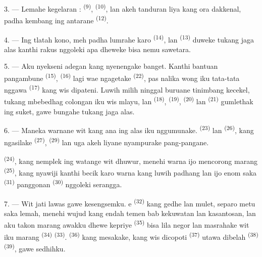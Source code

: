 3. --- Lemahe kegelaran  : 
\textsuperscript{(9)},  \textsuperscript{(10)},
lan akeh tanduran liya kang ora dakkenal, padha kembang ing antarane
 \textsuperscript{(12)}.

4. --- Ing tlatah kono,  meh padha lumrahe karo
 \textsuperscript{(14)}, lan 
\textsuperscript{(13)} duweke tukang jaga alas kanthi rakus nggoleki
apa dheweke bisa nemu sawetara.

\VUsaut{3.0mm}
\VUsaut{3.0mm}

5. --- Aku nyekseni  adegan kang nyenengake banget.
Kanthi bantuan pangambune  \textsuperscript{(15)},
 \textsuperscript{(16)} lagi wae ngagetake
 \textsuperscript{(22)}, pas nalika
wong iku tata-tata nggawa  \textsuperscript{(17)} kang wis
dipateni. Luwih milih ninggal buruane tinimbang kecekel, tukang
mbebedhag colongan iku wis mlayu, lan 
\textsuperscript{(18)},  \textsuperscript{(19)},
 \textsuperscript{(20)} lan 
\textsuperscript{(21)} gumlethak ing suket, gawe bungahe tukang jaga
alas.

6. --- Maneka warnane wit kang ana ing alas iku nggumunake.  \textsuperscript{(23)} lan  \textsuperscript{(26)},
 kang ngasilake  \textsuperscript{(27)},
 \textsuperscript{(29)} lan uga akeh liyane nyampurake
pang-pangane.

 \textsuperscript{(24)}, kang nemplek ing watange wit
dhuwur, menehi warna ijo mencorong marang 
\textsuperscript{(25)}, kang nyawiji kanthi becik karo warna kang luwih
padhang lan ijo enom saka  \textsuperscript{(31)}
panggonan  \textsuperscript{(30)} nggoleki
serangga.

\VUsaut{3.0mm}
\VUsaut{3.0mm}

7. --- Wit jati lawas gawe kesengsemku. e
\textsuperscript{(32)} kang gedhe lan mulet, separo metu saka lemah,
menehi wujud kang endah temen bab kekuwatan lan kasantosan, lan aku
takon marang awakku dhewe kepriye 
\textsuperscript{(35)} bisa lila negor lan masrahake wit iku marang
 \textsuperscript{(34)} 
\textsuperscript{(33)}.  \textsuperscript{(36)} kang
mesakake, kang wis dicopoti  \textsuperscript{(37)}
utawa dibelah  \textsuperscript{(38)}  \textsuperscript{(39)}, gawe sedhihku.

